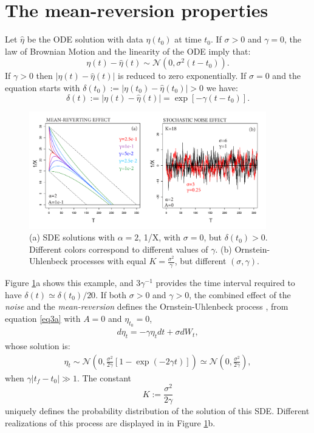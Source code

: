 \documentclass{article}
\begin{document}
\section{The mean-reversion properties}\label{s3}
Let $\hat\eta$ be the ODE solution with data $\eta(t_0)$ at time $t_0$. If $\sigma>0$ and $\gamma=0$, the law of Brownian Motion and the linearity of the ODE imply that:
$$\eta(t)-\hat\eta(t)\sim \mathcal N\left(0,\sigma^2(t-t_0)\right).$$
If $\gamma>0$ then $\left|\eta(t)-\hat\eta(t)\right|$ is reduced to zero exponentially. If $\sigma=0$ and the equation starts with $\delta(t_0):=|\eta(t_0)-\hat\eta(t_0)|>0$ we have:
$$\delta(t):=\left|\eta(t)-\hat\eta(t)\right|=\exp[-\gamma(t-t_0)].$$

\begin{figure}[H]
\centering
\includegraphics[width=0.92\textwidth]{Fig3_plusX.png}
\caption{(a) SDE solutions with $\alpha=2$, 1/X, with $\sigma=0$, but $\delta(t_0)>0$. Different colors correspond to different values of $\gamma$. (b) Ornstein-Uhlenbeck processes with equal $K=\frac{\sigma^2}{\gamma}$, but different $(\sigma, \gamma)$.}
\label{Fig3}
\end{figure}

Figure \ref{Fig3}a shows this example, and $3\gamma^{-1}$ provides the time interval required to have $\delta(t)\simeq\delta(t_0)/20$.
If both $\sigma>0$ and $\gamma>0$, the combined effect of the {\it noise} and the {\it mean-reversion} defines the Ornstein-Uhlenbeck process \citep{Gardiner2009}, from equation \ref{eq3a} with $A=0$ and $\eta_{t_0}=0$,
\begin{align}\label{eq4a}
d\eta_t=-\gamma\eta_t dt+\sigma dW_t,
\end{align}
whose solution is:
\begin{align}\label{eq4b}
\eta_t\sim\mathcal N\left(0,\frac{\sigma^2}{2\gamma}\left[1-\exp(-2\gamma t)\right]\right)\simeq \mathcal N\left(0,\frac{\sigma^2}{2\gamma}\right),
\end{align}
when $\gamma|t_f-t_0|\gg1$. The constant
$$K:=\frac{\sigma^2}{2\gamma}$$
uniquely defines the probability distribution of the solution of this SDE. Different realizations of this process are displayed in in Figure \ref{Fig3}b.
\end{document}
